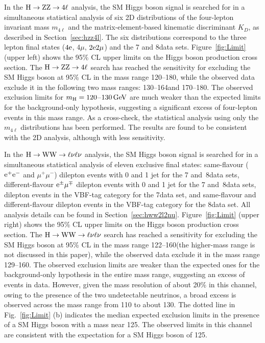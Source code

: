 \documentclass[12pt,twoside,a4paper,cmspaper,final,collab]{cms-tdr}
\begin{document}
In the $\mathrm{H} \rightarrow  \mathrm{Z}\mathrm{Z}   \rightarrow 4\ell$ analysis,
the SM Higgs boson signal is searched for in a simultaneous statistical analysis of six 2D distributions
of the four-lepton invariant mass $m_{4\ell}$ and the matrix-element-based kinematic discriminant $K_D$,
as described in Section~\ref{sec:hzz4l}.
The six distributions correspond to the three lepton final states ($4\mathrm{e}$, $4\mu$, $2\mathrm{e}2\mu$) and
the 7 and 8\TeV data sets.
Figure~\ref{fig:Limit} (upper left) shows the 95\% CL upper limits
on the Higgs boson production cross section. The $\mathrm{H} \to \mathrm{Z}\mathrm{Z}  \to 4\ell$ search has reached
the sensitivity for excluding the SM Higgs boson at 95\% CL
in the mass range 120--180\GeV,
while the observed data exclude it in the following two mass ranges:
130--164\GeV and 170--180\GeV.
The observed exclusion limits for $m_{\mathrm{H}}=120$--$130\,\text{Ge\hspace{-.08em}V}$
are much weaker than the expected limits for the background-only hypothesis,
suggesting a significant excess of four-lepton events in this mass range.
As a cross-check, the statistical analysis using only the  $m_{4\ell}$ distributions has been performed.
The results are found to be consistent with the 2D analysis, although with less sensitivity.





In the $\mathrm{H} \to \mathrm{W}\mathrm{W} \to \ell\nu\ell\nu$ analysis,
the SM Higgs boson signal is searched for in a simultaneous statistical analysis
of eleven exclusive final states:
same-flavour ($\mathrm{e}^+\mathrm{e}^-$ and $\mu^+\mu^-$) dilepton events with 0 and 1 jet for the 7 and~8\TeV data sets,
different-flavour $\mathrm{e}^{\pm}\mu^{\mp}$ dilepton events with 0 and 1 jet for the 7 and~8\TeV data sets,
dilepton events in the VBF-tag category for the 7\TeV data set,
and same-flavour and different-flavour dilepton events in the VBF-tag category for the 8\TeV data set.
All analysis details can be found in Section~\ref{sec:hww2l2nu}.
Figure~\ref{fig:Limit} (upper right) shows the 95\% CL upper limits
on the Higgs boson production cross section. The $\mathrm{H} \to \mathrm{W}\mathrm{W} \to \ell\nu\ell\nu$ search has reached
a sensitivity for excluding the SM Higgs boson at 95\% CL
in the mass range 122--160\GeV (the higher-mass range is not discussed in this paper),
while the observed data exclude it in the mass range 129--160\GeV.
The observed exclusion limits are weaker than the expected ones
for the background-only hypothesis in the entire mass range,
suggesting an excess of events in data.
However, given the mass resolution of about 20\% in this channel, owing to the presence of the two undetectable neutrinos,
a broad excess is observed across the mass range from 110 to about 130\GeV.
The dotted line in Fig.~\ref{fig:Limit} (b) indicates the median expected exclusion limits
in the presence of a SM Higgs boson with a mass near 125\GeV. The observed limits in this channel
are consistent with the expectation for a SM Higgs boson of 125\GeV.
\end{document}
